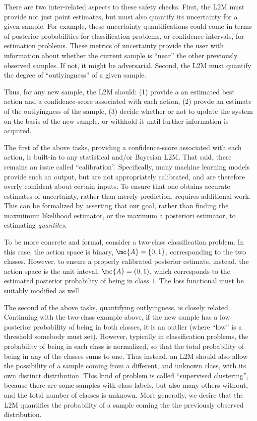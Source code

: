 \documentclass{article}
\begin{document}
There are two inter-related aspects to these safety checks.  First, the L2M must provide not just point estimates, but must also quantify its uncertainty for a given sample.  For example, these uncertainty quantifications could come in terms of posterior probabilities for classification problems, or confidence intervals, for estimation problems.  These metrics of uncertainty provide the user with information about whether the current sample is ``near'' the other previously observed samples.  If not, it might be adversarial.  Second, the L2M must quantify the degree of ``outlyingness'' of a given sample.  

Thus, for any new sample, the L2M should: (1) provide a an estimated best action and a confidence-score associated with each action, (2) provde an estimate of the outlyingness of the sample, (3) decide whether or not to update the system on the basis of the new sample, or withhold it until further information is acquired.  

The first of the above tasks, providing a confidence-score associated with each action, is built-in to any statistical and/or Bayesian L2M.  That said, there remains an issue called ``calibration''.  Specifically, many machine learning models provide such an output, but are not appropriately calibrated, and are therefore overly confident about certain inputs. To ensure that one obtains accurate estimates of uncertainty, rather than merely prediction, requires additional work.  This can be formalized by asserting that our goal, rather than finding the maxmimum likelihood estimator, or the maximum a posteriori estimator, to estimating \emph{quantiles}.  

To be more concrete and formal, consider a two-class classification problem.  In this case, the action space is binary, $\mc{A}=\{0,1\}$, corresponding to the two classes.  However, to ensure a properly calibrated posterior estimate, instead, the action space is the unit inteval, $\mc{A}=(0,1)$, which corresponds to the estimated posterior probability of being in class $1$. The loss functional must be suitably modified as well.  

The second of the above tasks, quantifying outlyingness, is closely related.  Continuing with the two-class example above, if the new sample has a low posterior probability of being in both classes, it is an outlier (where ``low'' is a threshold somebody must set).  However, typically in classification problems, the probability of being in each class is normalized, so that the total probability of being in any of the classes sums to one.  Thus instead, an L2M should also allow the possibility of a sample coming from a different, and unknown class, with its own distinct distribution.  This kind of problem is called ``supervised clustering'', because there are some samples with class labels, but also many others without, and the total number of classes is unknown.  More generally, we desire that the L2M quantifies the probability of a sample coming the the previously observed distribution.  
\end{document}
